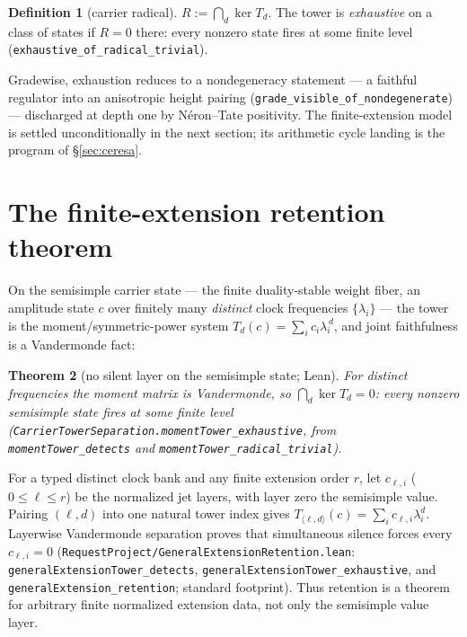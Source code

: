 \documentclass[11pt]{article}
\newtheorem{theorem}{Theorem}[section]
\theoremstyle{definition}
\newtheorem{definition}[theorem]{Definition}
\theoremstyle{remark}
\begin{document}
\begin{definition}[carrier radical]
$R:=\bigcap_d\ker T_d$. The tower is \emph{exhaustive} on a class of states if
$R=0$ there: every nonzero state fires at some finite level
\textup{(\texttt{exhaustive\_of\_radical\_trivial})}.
\end{definition}

Gradewise, exhaustion reduces to a nondegeneracy statement --- a faithful
regulator into an anisotropic height pairing
(\texttt{grade\_visible\_of\_nondegenerate}) --- discharged at depth one by
N\'eron--Tate positivity. The finite-extension model is settled unconditionally
in the next section; its arithmetic cycle landing is the program of \S\ref{sec:ceresa}.

\section{The finite-extension retention theorem}\label{sec:semisimple}

On the semisimple carrier state --- the finite duality-stable weight fiber, an
amplitude state $c$ over finitely many \emph{distinct} clock frequencies
$\{\lambda_i\}$ --- the tower is the moment/symmetric-power system
$T_d(c)=\sum_i c_i\lambda_i^{\,d}$, and joint faithfulness is a Vandermonde
fact:

\begin{theorem}[no silent layer on the semisimple state; Lean]\label{thm:semisimple}
For distinct frequencies the moment matrix is Vandermonde, so
$\bigcap_d\ker T_d=0$: every nonzero semisimple state fires at some finite
level
\textup{(\texttt{CarrierTowerSeparation.momentTower\_exhaustive}}, from
\texttt{momentTower\_detects} and
\texttt{momentTower\_radical\_trivial}\textup{)}.
\end{theorem}

For a typed distinct clock bank and any finite extension order $r$, let
$c_{\ell,i}$ ($0\leq\ell\leq r$) be the normalized jet layers, with layer zero
the semisimple value. Pairing $(\ell,d)$ into one natural tower index gives
$T_{\langle\ell,d\rangle}(c)=\sum_i c_{\ell,i}\lambda_i^d$. Layerwise
Vandermonde separation proves that simultaneous silence forces every
$c_{\ell,i}=0$ (\texttt{RequestProject/GeneralExtensionRetention.lean}:
\texttt{generalExtensionTower\_detects},
\texttt{generalExtensionTower\_exhaustive}, and
\texttt{generalExtension\_retention}; standard footprint). Thus retention is
a theorem for arbitrary finite normalized extension data, not only the
semisimple value layer.
\end{document}
